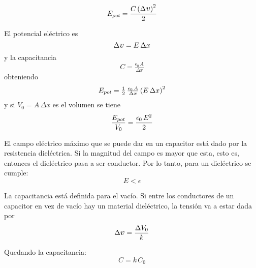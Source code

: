\begin{mdframed}[style=PropertyFrame]
    \begin{prop}
    \end{prop}
    \begin{equation*}
        \sub{E}{pot} = \frac{C \inParentheses{\Delta \voltage}^2}{2}
    \end{equation*}
\end{mdframed}

\begin{mdframed}[style=ExampleFrame]
    \begin{example}
    \end{example}

    El potencial eléctrico es
    \begin{equation*}
        \Delta \voltage = E \, \Delta x
    \end{equation*}
    y la capacitancia
    \begin{equation*}
        C = \tfrac{\epsilon_0 \, A}{\Delta x}
    \end{equation*}
    obteniendo
    \begin{equation*}
        {{E}_\textsl{{pot}}} = \tfrac{1}{2} \, \tfrac{\epsilon_0 \, A}{\Delta x} \left(E \, \Delta x\right)^2
    \end{equation*}
    y si $V_0 = A \, \Delta x$ es el volumen se tiene
    \begin{equation*}
        \frac{{{E}_\textsl{{pot}}}}{V_0} = \frac{\epsilon_0 \, E^2}{2}
    \end{equation*}
\end{mdframed}

El campo eléctrico máximo que se puede dar en un capacitor está dado por la resistencia dieléctrica.
Si la magnitud del campo es mayor que esta, esto es, entonces el dieléctrico pasa a ser conductor.
Por lo tanto, para un dieléctrico se cumple:
\begin{equation*}
    E < \epsilon
\end{equation*}

La capacitancia está definida para el vacío.
Si entre los conductores de un capacitor en vez de vacío hay un material dieléctrico, la tensión va a estar dada por
\begin{equation*}
    \Delta \voltage = \frac{\Delta V_0}{k}
\end{equation*}

Quedando la capacitancia:
\begin{equation*}
    C = k \, C_0
\end{equation*}